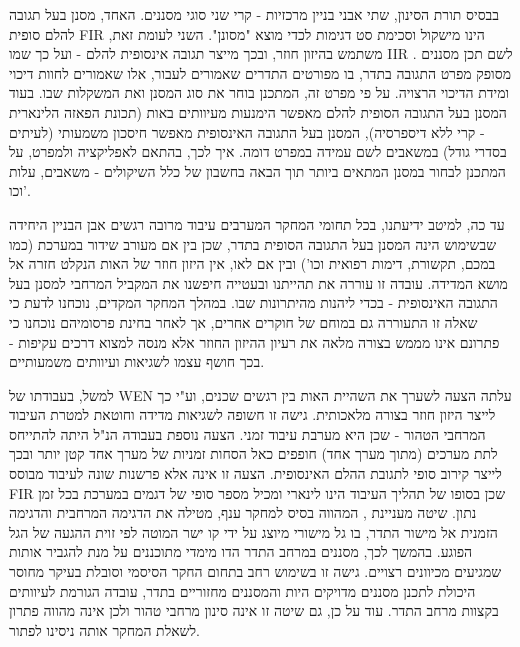 בבסיס תורת הסינון, שתי אבני בניין מרכזיות - קרי שני סוגי מסננים.
האחד, מסנן בעל תגובה להלם סופית 
\textenglish{FIR}
הינו מישקול וסכימת סט דגימות לכדי מוצא "מסונן".
השני לעומת זאת, משתמש בהיזון חוזר, ובכך מייצר תגובה אינסופית להלם - ועל כך שמו
\textenglish{IIR}
.
לשם תכן מסננים מסופק מפרט התגובה בתדר, בו מפורטים התדרים שאמורים לעבור, אלו שאמורים לחוות דיכוי ומידת הדיכוי הרצויה.
על פי מפרט זה, המתכנן בוחר את סוג המסנן ואת המשקלות שבו.
בעוד המסנן בעל התגובה הסופית להלם מאפשר הימנעות מעיוותים באות (תכונת הפאזה הלינארית - קרי ללא דיספרסיה), המסנן בעל התגובה האינסופית מאפשר חיסכון משמעותי (לעיתים בסדרי גודל) במשאבים לשם עמידה במפרט דומה.
איך לכך, בהתאם לאפליקציה ולמפרט, על המתכנן לבחור במסנן המתאים ביותר תוך הבאה בחשבון של כלל השיקולים - משאבים, עלות וכו'.
\par
עד כה, למיטב ידיעתנו, בכל תחומי המחקר המערבים עיבוד מרובה רגשים אבן הבניין היחידה שבשימוש הינה המסנן בעל התגובה הסופית בתדר, שכן בין אם מעורב שידור במערכת (כמו במכם, תקשורת, דימות רפואית וכו') ובין אם לאו, אין היזון חוזר של האות הנקלט חזרה אל מושא המדידה.
עובדה זו עוררה את תהייתנו ובעטייה חיפשנו את המקביל המרחבי למסנן בעל התגובה האינסופית - בכדי ליהנות מהיתרונות שבו.
במהלך המחקר המקדים, נוכחנו לדעת כי שאלה זו התעוררה גם במוחם של חוקרים אחרים, אך לאחר בחינת פרסומיהם נוכחנו כי פתרונם אינו מממש בצורה מלאה את רעיון ההיזון החוזר אלא מנסה למצוא דרכים עקיפות - בכך חושף עצמו לשגיאות ועיוותים משמעותיים.
\par
למשל, בעבודתו של WEN
\cite{wen2013extending}
עלתה הצעה לשערך את השהיית האות בין רגשים שכנים, וע"י כך לייצר היזון חוזר בצורה מלאכותית.
גישה זו חשופה לשגיאות מדידה וחוטאת למטרת העיבוד המרחבי הטהור - שכן היא מערבת עיבוד זמני.
הצעה נוספת בעבודה הנ"ל 
\cite{wen2013extending}
היתה להתייחס לתת מערכים (מתוך מערך אחד) חופפים כאל הסחות זמניות של מערך אחד קטן יותר ובכך לייצר קירוב סופי לתגובת ההלם האינסופית.
הצעה זו אינה אלא פרשנות שונה לעיבוד מבוסס 
\textenglish{FIR}
שכן בסופו של תהליך העיבוד הינו לינארי ומכיל מספר סופי של דגמים במערכת בכל זמן נתון.
שיטה מעניינת
\cite{Hum2009BeamformingFilters,madanayake2008speed}
, המהווה בסיס למחקר ענף, מטילה את הדגימה המרחבית והדגימה הזמנית אל מישור התדר, בו גל מישורי מיוצג על ידי קו ישר המוטה לפי זוית ההגעה של הגל הפוגע.
בהמשך לכך, מסננים במרחב התדר הדו מימדי מתוכננים על מנת להגביר אותות שמגיעים מכיוונים רצויים.
גישה זו בשימוש רחב בתחום החקר הסיסמי וסובלת בעיקר מחוסר היכולת לתכנן מסננים מדויקים היות והמסננים מחזוריים בתדר, עובדה הגורמת לעיוותים בקצוות מרחב התדר.
עוד על כן, גם שיטה זו אינה סינון מרחבי טהור ולכן אינה מהווה פתרון לשאלת המחקר אותה ניסינו לפתור.
\par
